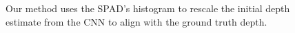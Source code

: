 
\begin{figure}
  \caption{Our method uses the SPAD's histogram to rescale the initial depth
    estimate from the CNN to align with the ground truth depth.}
\end{figure}


